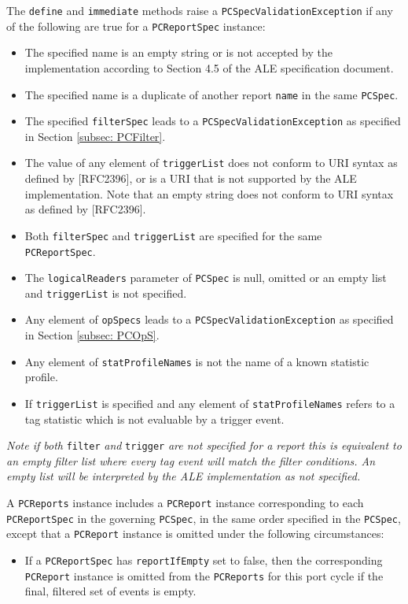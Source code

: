 \documentclass[11pt,a4paper,oneside]{article}
\newenvironment{code}%
   {\snugshade\begin{internallinenumbers}}%
   {\end{internallinenumbers}\endsnugshade}
\newenvironment{code}
    {\HCode{<div class='code'><p>}}
    {\HCode{</p></div>}}
\begin{document}
The \texttt{define} and \texttt{immediate} methods raise a \texttt{PCSpecValidationException} if any of the following are true for a \texttt{PCReportSpec} instance:
\begin{itemize}
\item	The specified name is an empty string or is not accepted by the implementation according to Section 4.5 of the ALE specification document.
\item	The specified name is a duplicate of another report \texttt{name} in the same \texttt{PCSpec}.
\item	The specified \texttt{filterSpec} leads to a \texttt{PCSpecValidationException} as specified in Section \ref{subsec: PCFilter}.
\item	The value of any element of \texttt{triggerList} does not conform to URI syntax as defined by [RFC2396], or is a URI that is not supported by the ALE implementation. Note that an empty string does not conform to URI syntax as defined by [RFC2396].
\item	Both \texttt{filterSpec} and \texttt{triggerList} are specified for the same \ifpdf\\\fi
\texttt{PCReportSpec}.
\item	The \texttt{logicalReaders} parameter of \texttt{PCSpec} is null, omitted or an empty list and \texttt{triggerList} is not specified.
\item	Any element of \texttt{opSpecs} leads to a \texttt{PCSpecValidationException} as specified in Section \ref{subsec: PCOpS}.
\item	Any element of \texttt{statProfileNames} is not the name of a known statistic profile.
\item	If \texttt{triggerList} is specified and any element of \texttt{statProfileNames} refers to a tag statistic which is not evaluable by a trigger event.
\end{itemize}
\bigskip
\begin {code}
\emph{Note if both} \texttt{filter} \emph{and} \texttt{trigger} \emph{are not specified for a report this is equivalent to an empty filter list where every tag event will match the filter conditions. An empty list will be interpreted by the ALE implementation as not specified.}
\end{code}

A \texttt{PCReports} instance includes a \texttt{PCReport} instance corresponding to each\ifpdf\\\fi
 \texttt{PCReportSpec} in the governing \texttt{PCSpec}, in the same order specified in the \texttt{PCSpec}, except that a \texttt{PCReport} instance is omitted under the following circumstances:
\begin{itemize}
\item	If a \texttt{PCReportSpec} has \texttt{reportIfEmpty} set to false, then the corresponding \texttt{PCReport} instance is omitted from the \texttt{PCReports} for this port cycle if the final, filtered set of events is empty.
\end{itemize}
\end{document}
